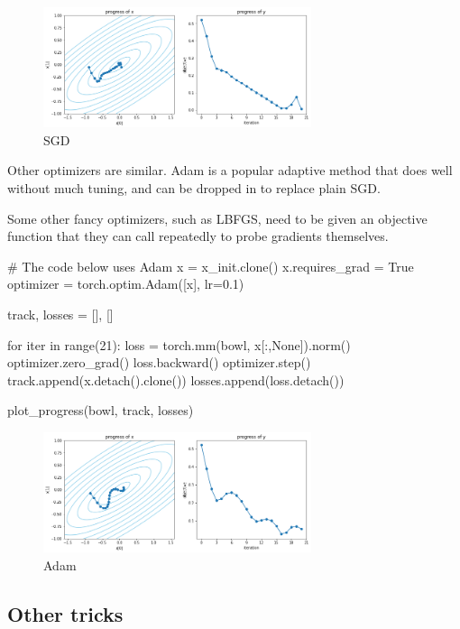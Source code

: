 \begin{figure}[H]
    \centering
    \includegraphics[width=0.7\textwidth]{assets/fig7.png}
    \caption{SGD}
\end{figure}

Other optimizers are similar. Adam is a popular adaptive method that does well without much tuning, and can be dropped in to replace plain SGD.

Some other fancy optimizers, such as LBFGS, need to be given an objective function that they can call repeatedly to probe gradients themselves. 

\begin{exampleblock}[Adam]
    \begin{codeblock}[language=python]
# The code below uses Adam
x = x_init.clone()
x.requires_grad = True
optimizer = torch.optim.Adam([x], lr=0.1)

track, losses = [], []

for iter in range(21):
    loss = torch.mm(bowl, x[:,None]).norm()
    optimizer.zero_grad()
    loss.backward()
    optimizer.step()
    track.append(x.detach().clone())
    losses.append(loss.detach())
    
plot_progress(bowl, track, losses)
    \end{codeblock}
\end{exampleblock}

\begin{figure}[H]
    \centering
    \includegraphics[width=0.7\textwidth]{assets/fig8.png}
    \caption{Adam}
\end{figure}

\subsection{Other tricks}

